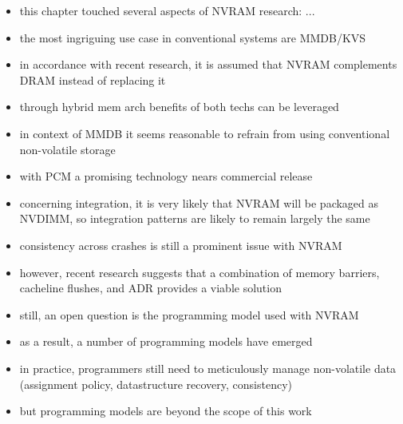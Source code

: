 \begin{itemize}
    \item this chapter touched several aspects of NVRAM research: ...
    \item the most ingriguing use case in conventional systems are MMDB/KVS
    \item in accordance with recent research, it is assumed that NVRAM complements DRAM instead of replacing it
    \item through hybrid mem arch benefits of both techs can be leveraged
    \item in context of MMDB it seems reasonable to refrain from using conventional non-volatile storage
    \item with PCM a promising technology nears commercial release
    \item concerning integration, it is very likely that NVRAM will be packaged as NVDIMM, so integration patterns are likely to remain largely the same
    \item consistency across crashes is still a prominent issue with NVRAM
    \item however, recent research suggests that a combination of memory barriers, cacheline flushes, and ADR provides a viable solution
    \item still, an open question is the programming model used with NVRAM
    \item as a result, a number of programming models have emerged
    \item in practice, programmers still need to meticulously manage non-volatile data (assignment policy, datastructure recovery, consistency)
    \item but programming models are beyond the scope of this work
\end{itemize}
